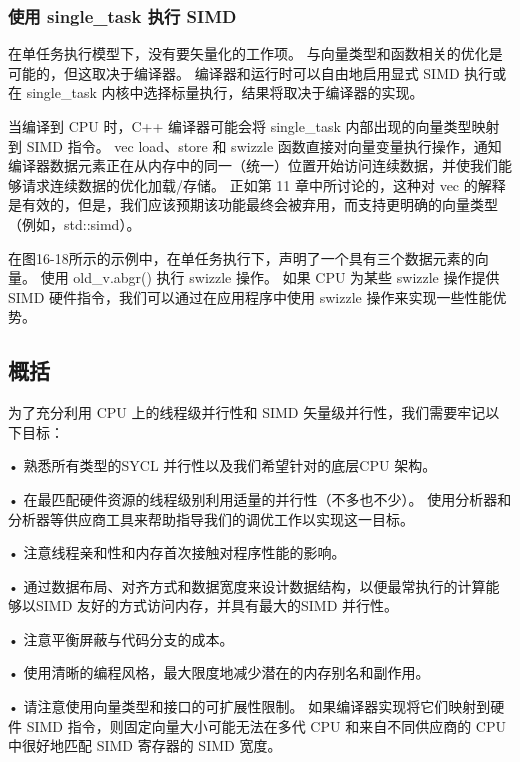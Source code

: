\subsubsection{使用 single\_task 执行 SIMD}
在单任务执行模型下，没有要矢量化的工作项。 与向量类型和函数相关的优化是可能的，但这取决于编译器。 编译器和运行时可以自由地启用显式 SIMD 执行或在 single\_task 内核中选择标量执行，结果将取决于编译器的实现。

当编译到 CPU 时，C++ 编译器可能会将 single\_task 内部出现的向量类型映射到 SIMD 指令。 vec load、store 和 swizzle 函数直接对向量变量执行操作，通知编译器数据元素正在从内存中的同一（统一）位置开始访问连续数据，并使我们能够请求连续数据的优化加载/存储。 正如第 11 章中所讨论的，这种对 vec 的解释是有效的，但是，我们应该预期该功能最终会被弃用，而支持更明确的向量类型（例如，std::simd）。

在图16-18所示的示例中，在单任务执行下，声明了一个具有三个数据元素的向量。 使用 old\_v.abgr() 执行 swizzle 操作。 如果 CPU 为某些 swizzle 操作提供 SIMD 硬件指令，我们可以通过在应用程序中使用 swizzle 操作来实现一些性能优势。

\subsection{概括}
为了充分利用 CPU 上的线程级并行性和 SIMD 矢量级并行性，我们需要牢记以下目标：

• 熟悉所有类型的SYCL 并行性以及我们希望针对的底层CPU 架构。

• 在最匹配硬件资源的线程级别利用适量的并行性（不多也不少）。 使用分析器和分析器等供应商工具来帮助指导我们的调优工作以实现这一目标。

• 注意线程亲和性和内存首次接触对程序性能的影响。

• 通过数据布局、对齐方式和数据宽度来设计数据结构，以便最常执行的计算能够以SIMD 友好的方式访问内存，并具有最大的SIMD 并行性。

• 注意平衡屏蔽与代码分支的成本。

• 使用清晰的编程风格，最大限度地减少潜在的内存别名和副作用。

• 请注意使用向量类型和接口的可扩展性限制。 如果编译器实现将它们映射到硬件 SIMD 指令，则固定向量大小可能无法在多代 CPU 和来自不同供应商的 CPU 中很好地匹配 SIMD 寄存器的 SIMD 宽度。